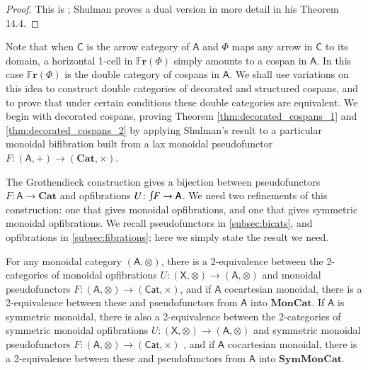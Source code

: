\documentclass[reqno]{amsart}
\let\maps\colon
\theoremstyle{definition}
\theoremstyle{remark}
\newcommand{\A}{\mathsf{A}}
\newcommand{\C}{\mathsf{C}}
\newcommand{\X}{\mathsf{X}}
\newcommand{\bicat}{\mathbf}
\newcommand{\Cat}{\bicat{Cat}}
\newcommand{\MonCat}{\bicat{MonCat}}
\newcommand{\SMC}{\bicat{SymMonCat}}
\newcommand{\double}[1]{\mathbf{\mathbb #1}}
\newcommand{\Fr}{\double{Fr}}
\newcommand{\inta}{\raisebox{.3\depth}{$\smallint\hspace{-.01in}$}}
\begin{document}
\begin{proof} This is \cite[Theorem 14.9]{Shulman2008}; Shulman proves a dual version in more detail in his Theorem 14.4.  
\end{proof}

Note that when $\C$ is the arrow category of $\A$ and $\Phi$ maps any arrow in $\C$ to its
domain, a horizontal 1-cell in $\Fr(\Phi)$ simply amounts to a cospan in $\A$. In this case $\Fr(\Phi)$ is the double category of cospans in $\A$.    We shall use variations on this idea to construct double categories of decorated and structured cospans, and to prove that under certain conditions these double categories are equivalent.    We begin with decorated cospans, proving Theorem \ref{thm:decorated_cospans_1} and \ref{thm:decorated_cospans_2} by applying Shulman's result to a particular monoidal bifibration built from a lax monoidal pseudofunctor $F \maps (\A,+) \to (\Cat,\times)$.   

The Grothendieck construction gives a bijection between pseudofunctors $F \maps \A \to \Cat$ and opfibrations $U \maps \inta F \to \A$.  We need two refinements of this construction: one that gives monoidal opfibrations, and one that gives symmetric monoidal opfibrations.  We recall pseudofunctors in \cref{subsec:bicats}, and opfibrations in \cref{subsec:fibrations}; here we simply state the result we need.

\begin{lem}
\label{lem:MonGroth}
For any monoidal category $(\A,\otimes)$, there is a 2-equivalence between the 2-categories of monoidal opfibrations $U\maps (\X, \otimes) \to (\A, \otimes)$ and monoidal pseudofunctors $F \maps (\A,\otimes) \to (\mathsf{Cat}, \times)$, and if $\A$ cocartesian monoidal, there is a 2-equivalence between these and pseudofunctors from $\A$ into $\MonCat$.  If $\A$ is symmetric monoidal, there is also a 2-equivalence between the 2-categories of symmetric monoidal opfibrations $U \maps (\X, \otimes) \to (\A, \otimes)$ and symmetric monoidal pseudofunctors $F \maps  (\A,\otimes) \to (\mathsf{Cat}, \times)$ , and if $\A$ cocartesian monoidal, there is a 2-equivalence between these and pseudofunctors from $\A$ into $\SMC$.
\end{lem}
\end{document}
